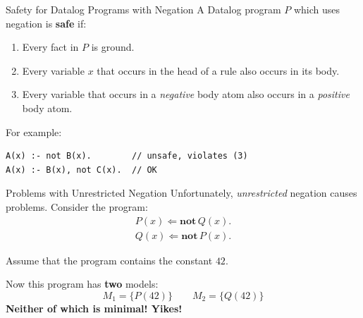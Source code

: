 \begin{frame}[fragile]{Safety for Datalog Programs with Negation}
A Datalog program $P$ which uses negation is \textbf{safe} if:
\begin{enumerate}
    \item Every fact in $P$ is ground.
    \item Every variable $x$ that occurs in the head of a rule also occurs in
    its body.
    \item Every variable that occurs in a \emph{negative} body atom also occurs
    in a \emph{positive} body atom.
\end{enumerate}

\pause

For example:
\begin{lstlisting}[language=flix,xleftmargin=0.8cm]
A(x) :- not B(x).        // unsafe, violates (3)
A(x) :- B(x), not C(x).  // OK
\end{lstlisting}
\end{frame}

\begin{frame}{Problems with Unrestricted Negation}
Unfortunately, \emph{unrestricted} negation causes problems. Consider the program:
%
\begin{align*}
P(x) \Leftarrow \textbf{not} \, Q(x). \\ 
Q(x) \Leftarrow \textbf{not} \, P(x).
\end{align*}

\pause

Assume that the program contains the constant $42$. 

Now this program has \textbf{two} models:
%
$$
    M_1 = \{ P(42) \} \qquad M_2 = \{ Q(42) \}
$$
%
\textbf{Neither of which is minimal! Yikes!}
\end{frame}

